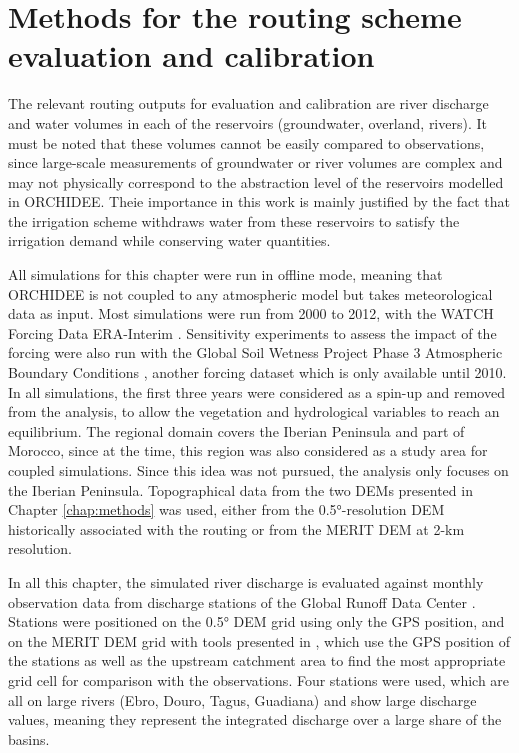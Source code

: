 \section{Methods for the routing scheme evaluation and calibration}

The relevant routing outputs for evaluation and calibration are river discharge and water volumes in each of the reservoirs (groundwater, overland, rivers). 
It must be noted that these volumes cannot be easily compared to observations, since large-scale measurements of groundwater or river volumes are complex and may not physically correspond to the abstraction level of the reservoirs modelled in ORCHIDEE.
Theie importance in this work is mainly justified by the fact that the irrigation scheme withdraws water from these reservoirs to satisfy the irrigation demand while conserving water quantities.

All simulations for this chapter were run in offline mode, meaning that ORCHIDEE is not coupled to any atmospheric model but takes meteorological data as input. 
Most simulations were run from 2000 to 2012, with the WATCH Forcing Data ERA-Interim \citep[WFDEI, ][]{weedon_wfdei_2014}. Sensitivity experiments to assess the impact of the forcing were also run with the Global Soil Wetness Project Phase 3 Atmospheric Boundary Conditions \citep[GSWP3, ][]{kim_hyungjun_global_2017}, another forcing dataset which is only available until 2010.
In all simulations, the first three years were considered as a spin-up and removed from the analysis, to allow the vegetation and hydrological variables to reach an equilibrium. The regional domain covers the Iberian Peninsula and part of Morocco, since at the time, this region was also considered as a study area for coupled simulations. Since this idea was not pursued, the analysis only focuses on the Iberian Peninsula.
Topographical data from the two DEMs presented in Chapter \ref{chap:methods} was used, either from the 0.5°-resolution DEM historically associated with the \std routing or from the MERIT DEM at 2-km resolution.

In all this chapter, the simulated river discharge is evaluated against monthly observation data from discharge stations of the Global Runoff Data Center \cite[GRDC, https://grdc.bafg.de,][]{fekete_global_2003}.
Stations were positioned on the 0.5° DEM grid using only the GPS position, and on the MERIT DEM grid with tools presented in \cite{polcher_hydrological_2023}, which use the GPS position of the stations as well as the upstream catchment area to find the most appropriate grid cell for comparison with the observations. 
Four stations were used, which are all on large rivers (Ebro, Douro, Tagus, Guadiana) and show large discharge values, meaning they represent the integrated discharge over a large share of the basins.

